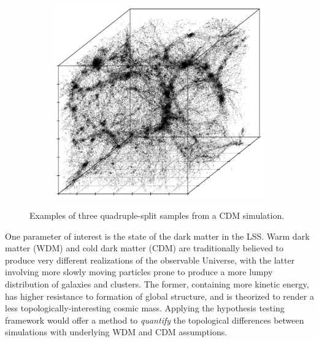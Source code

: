 \documentclass[12pt]{article}
\begin{document}
\begin{figure}[htp!]
\begin{subfigure}{0.25\textwidth}
    \label{fig:cubeDiagsB}
  \end{subfigure}
    \begin{subfigure}{0.25\textwidth}
    \centering
        \caption{}
  \includegraphics[width=\linewidth]{triplesplitC.pdf}
    \label{fig:cubeDiagsC}
  \end{subfigure}
    \caption{Examples of three quadruple-split samples from a CDM simulation.}
    \label{fig:cubeDiags}
\end{figure}

One parameter of interest is the state of the dark matter in the LSS. Warm dark matter (WDM) and cold dark matter (CDM) are traditionally believed to produce very different realizations of the observable Universe, with the latter involving more slowly moving particles prone to produce a more lumpy distribution of galaxies and clusters. The former, containing more kinetic energy, has higher resistance to formation of global structure, and is theorized to render a less topologically-interesting cosmic mass. Applying the hypothesis testing framework would offer a method to \emph{quantify} the topological differences between simulations with underlying WDM and CDM assumptions.
\end{document}
